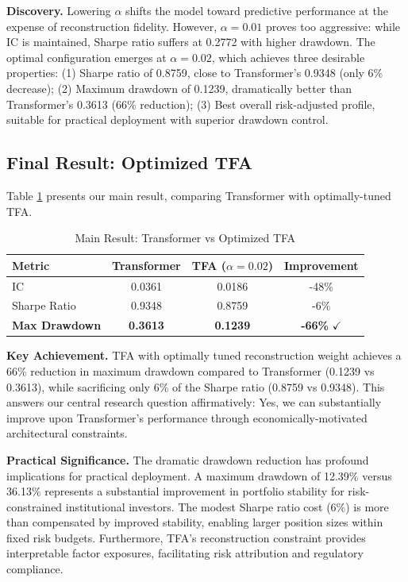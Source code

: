 \documentclass[12pt]{article}
\begin{document}
\textbf{Discovery.} Lowering $\alpha$ shifts the model toward predictive performance at the expense of reconstruction fidelity. However, $\alpha=0.01$ proves too aggressive: while IC is maintained, Sharpe ratio suffers at 0.2772 with higher drawdown. The optimal configuration emerges at $\alpha=0.02$, which achieves three desirable properties: (1) Sharpe ratio of 0.8759, close to Transformer's 0.9348 (only 6\% decrease); (2) Maximum drawdown of 0.1239, dramatically better than Transformer's 0.3613 (66\% reduction); (3) Best overall risk-adjusted profile, suitable for practical deployment with superior drawdown control.

\subsection{Final Result: Optimized TFA}

Table \ref{tab:final} presents our main result, comparing Transformer with optimally-tuned TFA.

\begin{table}[ht!]
\centering
\caption{Main Result: Transformer vs Optimized TFA}
\label{tab:final}
\begin{tabular}{lccc}
\toprule
\textbf{Metric} & \textbf{Transformer} & \textbf{TFA ($\alpha=0.02$)} & \textbf{Improvement} \\
\midrule
IC & 0.0361 & 0.0186 & -48\% \\
Sharpe Ratio & 0.9348 & 0.8759 & -6\% \\
\textbf{Max Drawdown} & \textbf{0.3613} & \textbf{0.1239} & \textbf{-66\%} $\checkmark$ \\
\bottomrule
\end{tabular}
\end{table}

\textbf{Key Achievement.} TFA with optimally tuned reconstruction weight achieves a 66\% reduction in maximum drawdown compared to Transformer (0.1239 vs 0.3613), while sacrificing only 6\% of the Sharpe ratio (0.8759 vs 0.9348). This answers our central research question affirmatively: Yes, we can substantially improve upon Transformer's performance through economically-motivated architectural constraints.

\textbf{Practical Significance.} The dramatic drawdown reduction has profound implications for practical deployment. A maximum drawdown of 12.39\% versus 36.13\% represents a substantial improvement in portfolio stability for risk-constrained institutional investors. The modest Sharpe ratio cost (6\%) is more than compensated by improved stability, enabling larger position sizes within fixed risk budgets. Furthermore, TFA's reconstruction constraint provides interpretable factor exposures, facilitating risk attribution and regulatory compliance.
\end{document}
